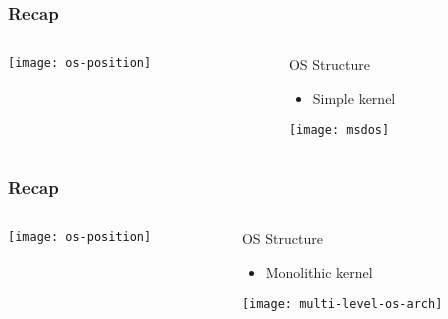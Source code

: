 \begin{frame}[plain]
	\frametitle{Recap}



	\begin{columns}

	\begin{column}{.5\textwidth}
	
	\texttt{[image: os-position]}
	
	\end{column}

	\begin{column}{.5\textwidth}
	
	\Large
    OS Structure	
	\begin{itemize}
	\item Simple kernel
	\end{itemize}	

	\texttt{[image: msdos]}		
	\end{column}
	

\end{columns}


\end{frame}


\begin{frame}[plain]
	\frametitle{Recap}
	
	
	
	\begin{columns}
		
		\begin{column}{.5\textwidth}
			
			\texttt{[image: os-position]}
			
		\end{column}
		
		\begin{column}{.5\textwidth}
			
			\Large
			OS Structure	
			\begin{itemize}
					\item Monolithic kernel
			\end{itemize}	
			
			\texttt{[image: multi-level-os-arch]}		
		\end{column}
		
		
	\end{columns}
	
	
\end{frame}

